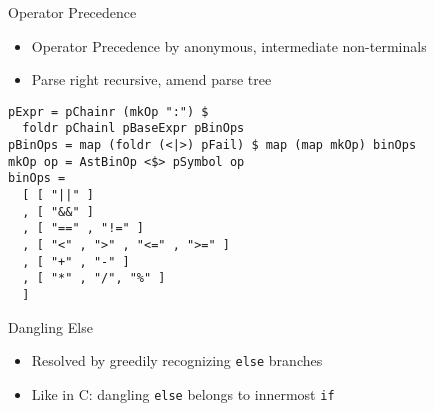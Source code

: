 \documentclass{beamer}
\begin{document}
\begin{frame}[fragile]{Operator Precedence}

\begin{itemize}
  \item Operator Precedence by anonymous, intermediate non-terminals
  \item Parse right recursive, amend parse tree
\end{itemize}

\begin{verbatim}
pExpr = pChainr (mkOp ":") $
  foldr pChainl pBaseExpr pBinOps
pBinOps = map (foldr (<|>) pFail) $ map (map mkOp) binOps
mkOp op = AstBinOp <$> pSymbol op
binOps =
  [ [ "||" ]
  , [ "&&" ]
  , [ "==" , "!=" ]
  , [ "<" , ">" , "<=" , ">=" ]
  , [ "+" , "-" ]
  , [ "*" , "/", "%" ]
  ]
\end{verbatim}

\end{frame}


\begin{frame}{Dangling Else}

\begin{itemize}
  \item Resolved by greedily recognizing \texttt{else} branches
  \item Like in C: dangling \texttt{else} belongs to innermost \texttt{if}
\end{itemize}

\end{frame}
\end{document}
